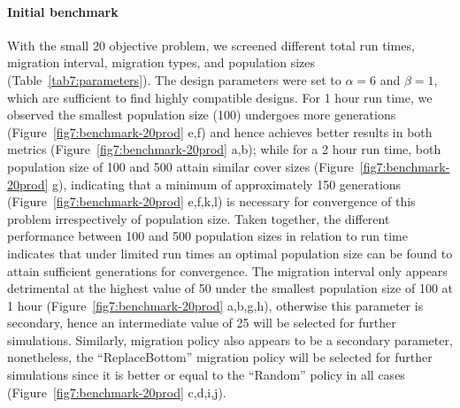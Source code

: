 {\paragraph{Initial benchmark}
With the small 20 objective problem, we screened different total run times, migration interval, migration types, and population sizes (Table~\ref{tab7:parameters}). The design parameters were set to $\alpha=6$ and $\beta=1$, which are sufficient to find highly compatible designs.\citep{garcia2019d}
For 1 hour run time, we observed the smallest population size (100) undergoes more generations (Figure~\ref{fig7:benchmark-20prod} e,f) and hence achieves better results in both metrics (Figure~\ref{fig7:benchmark-20prod} a,b); while for a 2 hour run time, both population size of 100 and 500 attain similar cover sizes (Figure~\ref{fig7:benchmark-20prod} g), indicating that a minimum of approximately 150 generations (Figure~\ref{fig7:benchmark-20prod} e,f,k,l) is necessary for convergence of this problem irrespectively of population size.
Taken together, the different performance between 100 and 500 population sizes in relation to run time indicates that under limited run times an optimal population size can be found to attain sufficient generations for convergence.
The migration interval only appears detrimental at the highest value of 50 under the smallest population size of 100 at 1 hour (Figure~\ref{fig7:benchmark-20prod} a,b,g,h), otherwise this parameter is secondary, hence an intermediate value of 25 will be selected for further simulations. Similarly, migration policy also appears to be a secondary parameter, nonetheless, the ``ReplaceBottom'' migration policy will be selected for further simulations since it is better or equal to the ``Random'' policy in all cases (Figure~\ref{fig7:benchmark-20prod} c,d,i,j).

}
